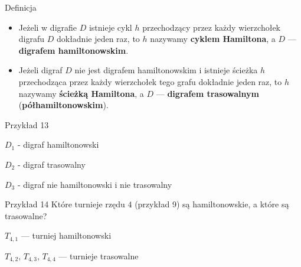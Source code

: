 \documentclass[a4paper,10pt]{beamer}
\begin{document}
\begin{frame}

\begin{block}{Definicja}
\begin{itemize}
	\item	Jeżeli w digrafie $D$ istnieje cykl $h$ przechodzący przez każdy wierzchołek digrafu $D$ dokładnie jeden raz, to $h$ nazywamy {\bf cyklem Hamiltona}, a $D$ --- {\bf digrafem hamiltonowskim}.
	\item Jeżeli digraf $D$ nie jest digrafem hamiltonowskim i istnieje ścieżka $h$ przechodząca przez każdy wierzchołek tego grafu dokładnie jeden raz, to $h$ nazywamy {\bf ścieżką Hamiltona}, a $D$ --- {\bf digrafem trasowalnym} ({\bf półhamiltonowskim}).
\end{itemize}
\end{block}

\end{frame}


\begin{frame}

\begin{exampleblock}{Przykład 13}



$D_1$ - digraf hamiltonowski

$D_2$ - digraf trasowalny

$D_3$ - digraf nie hamiltonowski i nie trasowalny

\end{exampleblock}

\bigskip

\begin{exampleblock}{Przykład 14}
Które turnieje rzędu $4$ (przykład 9) są hamiltonowskie, a które są trasowalne?

\medskip

$T_{4,1}$ --- turniej hamiltonowski

$T_{4,2},\,T_{4,3},\,T_{4,4}$ --- turnieje trasowalne

\end{exampleblock}

\end{frame}
\end{document}
